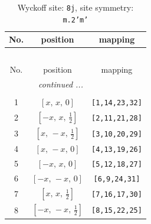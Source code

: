 \documentclass[fleqn,8pt]{jsarticle}
\begin{document}
\begin{longtable}{ccc}
\caption{Wyckoff site: {\tt 8j}, site symmetry: {\tt m.2'm'}}
 \\
 \hline \hline
No. & position & mapping \\ \hline \endfirsthead

\multicolumn{2}{l}{\tablename\ \thetable{}} \\
 \hline \hline
No. & position & mapping \\ \hline \endhead

 \hline \hline
\multicolumn{2}{r}{\footnotesize\it continued ...} \\ \endfoot

 \hline \hline
\multicolumn{2}{r}{} \\ \endlastfoot

1 & $\left[ x,\, x,\, 0 \right]$ & {\tt [1,14,23,32]} \\ \hline
2 & $\left[ - x,\, x,\, \frac{1}{2} \right]$ & {\tt [2,11,21,28]} \\ \hline
3 & $\left[ x,\, - x,\, \frac{1}{2} \right]$ & {\tt [3,10,20,29]} \\ \hline
4 & $\left[ x,\, - x,\, 0 \right]$ & {\tt [4,13,19,26]} \\ \hline
5 & $\left[ - x,\, x,\, 0 \right]$ & {\tt [5,12,18,27]} \\ \hline
6 & $\left[ - x,\, - x,\, 0 \right]$ & {\tt [6,9,24,31]} \\ \hline
7 & $\left[ x,\, x,\, \frac{1}{2} \right]$ & {\tt [7,16,17,30]} \\ \hline
8 & $\left[ - x,\, - x,\, \frac{1}{2} \right]$ & {\tt [8,15,22,25]} \\
\end{longtable}
\renewcommand{\arraystretch}{1.2}
\end{document}
